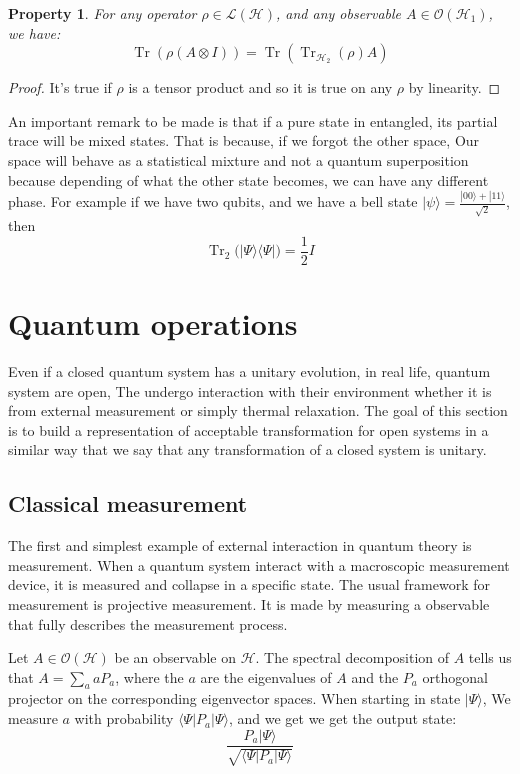 \documentclass[10pt]{report}
\theoremstyle{plain}
\newtheorem{prop}[thm]{Property}
\theoremstyle{definition}
\theoremstyle{remark}
\newcommand{\ket}[1]{|#1\rangle}
\newcommand{\bra}[1]{\langle#1|}
\DeclareMathOperator{\Tr}{Tr}
\begin{document}
\begin{prop}
  For any operator $\rho \in \mathcal{L}(\mathcal{H})$, and any observable
  $A\in\mathcal{O}(\mathcal{H}_1)$, we have:
  \[\Tr(\rho(A \otimes I)) = \Tr(\Tr_{\mathcal{H}_2}(\rho)A)\]
\end{prop}

\begin{proof}
  It's true if $\rho$ is a tensor product and so it is true on any $\rho$ by linearity.
\end{proof}

An important remark to be made is that if a pure state in entangled, its partial
trace will be mixed states. That is because, if we forgot the other space, Our
space will behave as a statistical mixture and not a quantum superposition
because depending of what the other state becomes, we can have any different phase.
For example if we have two qubits, and we have a
bell state $\ket \psi = \frac{\ket{00} + \ket{11}}{\sqrt 2}$, then
\[\Tr_2\big(\ket \Psi \bra \Psi\big) = \frac 12I\]


\section{Quantum operations}

Even if a closed quantum system has a unitary evolution, in real life, quantum
system are open, The undergo interaction with their environment whether it is
from external measurement or simply thermal relaxation. The goal of this section
is to build a representation of acceptable transformation for open systems in a
similar way that we say that any transformation of a closed system is unitary.

\subsection{Classical measurement}

The first and simplest example of external interaction in quantum theory is
measurement. When a quantum system interact with a macroscopic measurement
device, it is measured and collapse in a specific state. The usual framework for
measurement is projective measurement. It is
made by measuring a observable that fully describes the measurement
process.

Let $A \in \mathcal{O}(\mathcal{H})$ be an observable on $\mathcal{H}$. The
spectral decomposition of $A$ tells us that $A = \sum_a a P_a$, where the $a$
are the eigenvalues of $A$ and the $P_a$ orthogonal projector on the
corresponding eigenvector spaces. When starting in state $\ket \Psi$, We
measure $a$ with probability $\bra \Psi P_a \ket \Psi$, and we get we get
the output state:
\[ \frac{P_a \ket \Psi}{\sqrt{\bra \Psi P_a \ket \Psi}}\]
\end{document}
